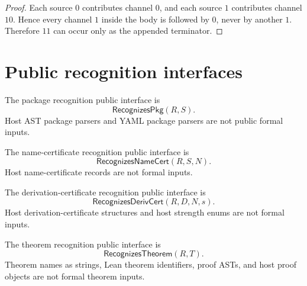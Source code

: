 \begin{proof}
Each source $0$ contributes channel $0$, and each source $1$ contributes channel $10$. Hence every channel $1$ inside the body is followed by $0$, never by another $1$. Therefore $11$ can occur only as the appended terminator.
\end{proof}

\section{Public recognition interfaces}
\label{sec:implementation-interface-public-recognition}

\begin{definition}
\label{def:implementation-interface-package-recognition-public}
The package recognition public interface is
$$
  \mathsf{RecognizesPkg}(R,S).
$$
Host AST package parsers and YAML package parsers are not public formal inputs.
\end{definition}

\begin{definition}
\label{def:implementation-interface-namecert-public}
The name-certificate recognition public interface is
$$
  \mathsf{RecognizesNameCert}(R,S,N).
$$
Host name-certificate records are not formal inputs.
\end{definition}

\begin{definition}
\label{def:implementation-interface-derivcert-public}
The derivation-certificate recognition public interface is
$$
  \mathsf{RecognizesDerivCert}(R,D,N,s).
$$
Host derivation-certificate structures and host strength enums are not formal inputs.
\end{definition}

\begin{definition}
\label{def:implementation-interface-theorem-public}
The theorem recognition public interface is
$$
  \mathsf{RecognizesTheorem}(R,T).
$$
Theorem names as strings, Lean theorem identifiers, proof ASTs, and host proof objects are not formal theorem inputs.
\end{definition}

